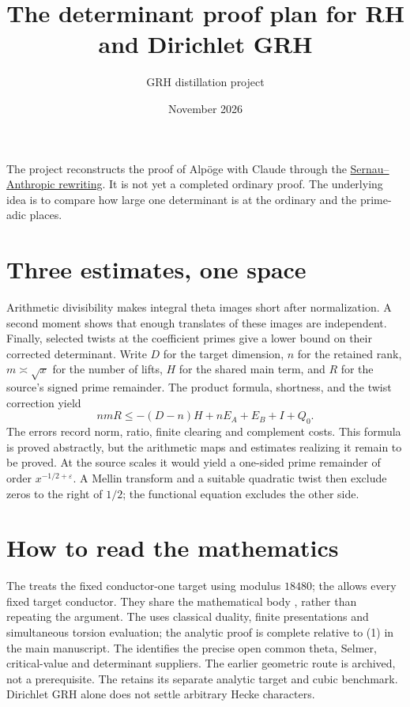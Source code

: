 
\title{The determinant proof plan for RH and Dirichlet GRH}
\author{GRH distillation project}
\date{November 2026}

\maketitle
The project reconstructs the proof of Alp\"oge with Claude through
the \href{\sourcepin}{Sernau--Anthropic rewriting}. It is not yet a
completed ordinary proof. The underlying idea is to compare how large
one determinant is at the ordinary and the prime-adic places.

\section{Three estimates, one space}
Arithmetic divisibility makes integral theta images short after
normalization. A second moment shows that enough translates of
these images are independent. Finally, selected twists at the
coefficient primes give a lower bound on their corrected determinant.
Write \(D\) for the target dimension, \(n\) for the retained rank,
\(m\asymp\sqrt{x}\) for the number of lifts, \(H\) for the shared main
term, and \(R\) for the source's signed prime remainder.
The product formula, shortness, and the twist correction yield
\[
 nmR\le -(D-n)H+nE_A+E_B+I+Q_0.
\]
The errors record norm, ratio, finite clearing and complement costs.
This formula is proved abstractly, but the arithmetic maps and
estimates realizing it remain to be proved. At the source scales it
would yield a one-sided prime remainder of order
\(x^{-1/2+\varepsilon}\). A Mellin transform and a suitable quadratic
twist then exclude zeros to the right of \(1/2\); the functional equation
excludes the other side.

\section{How to read the mathematics}
The  treats the fixed
conductor-one target using modulus \(18480\); the
 allows every
fixed target conductor. They share the mathematical body
, rather than repeating
the argument.
The  uses classical duality, finite presentations and simultaneous
torsion evaluation; the 
{analytic proof} is complete relative to (1) in the main manuscript.
The  identifies
the precise open common theta, Selmer, critical-value and determinant
suppliers. The earlier geometric route is archived, not a prerequisite.
The  retains its separate
analytic target and cubic benchmark. Dirichlet GRH alone does not
settle arbitrary Hecke characters.

